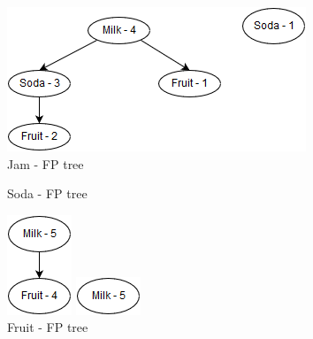 \documentclass{article}
\begin{document}
\begin{flushleft}
\begin{figure}[H]
\begin{minipage}[t]{0.5\textwidth}
		\centering
		\caption{Jam - FP tree}
		\includegraphics[scale = 0.5]{JamTree}
	\end{minipage}
\end{figure}
\begin{figure}[H]
	\centering
	\begin{minipage}[t]{0.5\textwidth}
		\centering
		\caption{Soda - FP tree}
		\includegraphics[scale = 0.5]{SodaTree}
	\end{minipage}%
	\begin{minipage}[t]{0.5\textwidth}
		\centering
		\caption{Fruit - FP tree}
		\includegraphics[scale = 0.5]{FruitTree}
	\end{minipage}
\end{figure}




\end{flushleft}
\end{document}
